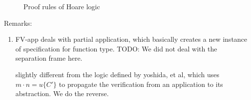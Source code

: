 \begin{figure}
    \caption{Proof rules of Hoare logic}
    \label{fig:choarelogic}
\end{figure}

Remarks:
\begin{enumerate}
    \item FV-app deals with partial application, which basically creates a new instance of specification for function type. TODO: We did not deal with the separation frame here.
    
    slightly different from the logic defined by yoshida, et al, which uses $m\cdot n=u\{C'\}$ to propagate the verification from an application to its abstraction.  We do the reverse. 
\end{enumerate}


